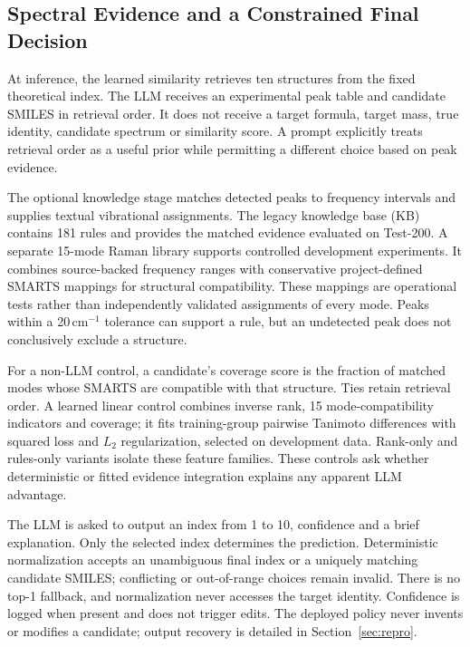 \subsection{Spectral Evidence and a Constrained Final Decision}\label{sec:selection}
At inference, the learned similarity retrieves ten structures from the fixed theoretical index. The LLM receives an experimental peak table and candidate SMILES in retrieval order. It does not receive a target formula, target mass, true identity, candidate spectrum or similarity score. A prompt explicitly treats retrieval order as a useful prior while permitting a different choice based on peak evidence.

The optional knowledge stage matches detected peaks to frequency intervals and supplies textual vibrational assignments. The legacy knowledge base (KB) contains 181 rules and provides the matched evidence evaluated on Test-200. A separate 15-mode Raman library supports controlled development experiments. It combines source-backed frequency ranges with conservative project-defined SMARTS mappings for structural compatibility. These mappings are operational tests rather than independently validated assignments of every mode. Peaks within a 20\,cm$^{-1}$ tolerance can support a rule, but an undetected peak does not conclusively exclude a structure.

For a non-LLM control, a candidate's coverage score is the fraction of matched modes whose SMARTS are compatible with that structure. Ties retain retrieval order. A learned linear control combines inverse rank, 15 mode-compatibility indicators and coverage; it fits training-group pairwise Tanimoto differences with squared loss and $L_2$ regularization, selected on development data. Rank-only and rules-only variants isolate these feature families. These controls ask whether deterministic or fitted evidence integration explains any apparent LLM advantage.

The LLM is asked to output an index from 1 to 10, confidence and a brief explanation. Only the selected index determines the prediction. Deterministic normalization accepts an unambiguous final index or a uniquely matching candidate SMILES; conflicting or out-of-range choices remain invalid. There is no top-1 fallback, and normalization never accesses the target identity. Confidence is logged when present and does not trigger edits. The deployed policy never invents or modifies a candidate; output recovery is detailed in Section~\ref{sec:repro}.
